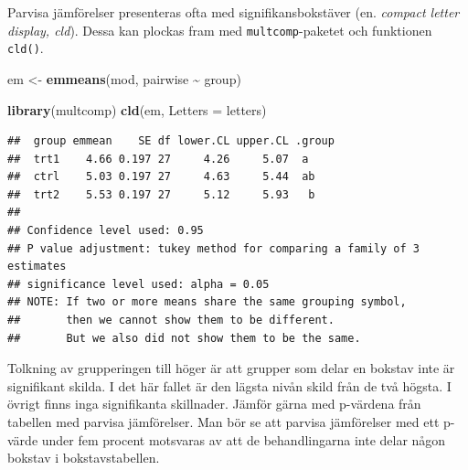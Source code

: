 \documentclass[
]{book}
\newenvironment{Shaded}{\begin{snugshade}}{\end{snugshade}}
\newcommand{\AttributeTok}[1]{\textcolor[rgb]{0.13,0.29,0.53}{#1}}
\newcommand{\FunctionTok}[1]{\textcolor[rgb]{0.13,0.29,0.53}{\textbf{#1}}}
\newcommand{\NormalTok}[1]{#1}
\newcommand{\OtherTok}[1]{\textcolor[rgb]{0.56,0.35,0.01}{#1}}
\newcommand{\SpecialCharTok}[1]{\textcolor[rgb]{0.81,0.36,0.00}{\textbf{#1}}}
\theoremstyle{definition}
\theoremstyle{definition}
\theoremstyle{definition}
\theoremstyle{definition}
\theoremstyle{remark}
\begin{document}
Parvisa jämförelser presenteras ofta med signifikansbokstäver (en. \emph{compact letter display, cld}). Dessa kan plockas fram med \texttt{multcomp}-paketet och funktionen \texttt{cld()}.

\begin{Shaded}
\begin{Highlighting}[]
\NormalTok{em }\OtherTok{\textless{}{-}} \FunctionTok{emmeans}\NormalTok{(mod, pairwise }\SpecialCharTok{\textasciitilde{}}\NormalTok{ group)}

\FunctionTok{library}\NormalTok{(multcomp)}
\FunctionTok{cld}\NormalTok{(em, }\AttributeTok{Letters =}\NormalTok{ letters)}
\end{Highlighting}
\end{Shaded}

\begin{verbatim}
##  group emmean    SE df lower.CL upper.CL .group
##  trt1    4.66 0.197 27     4.26     5.07  a    
##  ctrl    5.03 0.197 27     4.63     5.44  ab   
##  trt2    5.53 0.197 27     5.12     5.93   b   
## 
## Confidence level used: 0.95 
## P value adjustment: tukey method for comparing a family of 3 estimates 
## significance level used: alpha = 0.05 
## NOTE: If two or more means share the same grouping symbol,
##       then we cannot show them to be different.
##       But we also did not show them to be the same.
\end{verbatim}

Tolkning av grupperingen till höger är att grupper som delar en bokstav inte är signifikant skilda. I det här fallet är den lägsta nivån skild från de två högsta. I övrigt finns inga signifikanta skillnader. Jämför gärna med p-värdena från tabellen med parvisa jämförelser. Man bör se att parvisa jämförelser med ett p-värde under fem procent motsvaras av att de behandlingarna inte delar någon bokstav i bokstavstabellen.
\end{document}
